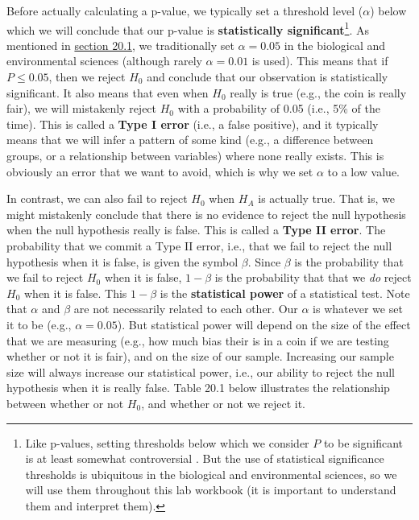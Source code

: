 \documentclass[
]{scrbook}
\begin{document}
Before actually calculating a p-value, we typically set a threshold level (\(\alpha\)) below which we will conclude that our p-value is \textbf{statistically significant}\footnote{Like p-values, setting thresholds below which we consider \(P\) to be significant is at least somewhat controversial \citep{McShane2019, Mayo2021}. But the use of statistical significance thresholds is ubiquitous in the biological and environmental sciences, so we will use them throughout this lab workbook (it is important to understand them and interpret them).}.
As mentioned in \protect\hyperlink{how-ridiculous-is-our-hypothesis}{section 20.1}, we traditionally set \(\alpha= 0.05\) in the biological and environmental sciences (although rarely \(\alpha = 0.01\) is used).
This means that if \(P \leq 0.05\), then we reject \(H_{0}\) and conclude that our observation is statistically significant.
It also means that even when \(H_{0}\) really is true (e.g., the coin is really fair), we will mistakenly reject \(H_{0}\) with a probability of 0.05 (i.e., 5\% of the time).
This is called a \textbf{Type I error} (i.e., a false positive), and it typically means that we will infer a pattern of some kind (e.g., a difference between groups, or a relationship between variables) where none really exists.
This is obviously an error that we want to avoid, which is why we set \(\alpha\) to a low value.

In contrast, we can also fail to reject \(H_{0}\) when \(H_{A}\) is actually true.
That is, we might mistakenly conclude that there is no evidence to reject the null hypothesis when the null hypothesis really is false.
This is called a \textbf{Type II error}.
The probability that we commit a Type II error, i.e., that we fail to reject the null hypothesis when it is false, is given the symbol \(\beta\).
Since \(\beta\) is the probability that we fail to reject \(H_{0}\) when it is false, \(1 - \beta\) is the probability that that we \emph{do} reject \(H_{0}\) when it is false.
This \(1 - \beta\) is the \textbf{statistical power} of a statistical test.
Note that \(\alpha\) and \(\beta\) are not necessarily related to each other.
Our \(\alpha\) is whatever we set it to be (e.g., \(\alpha = 0.05\)).
But statistical power will depend on the size of the effect that we are measuring (e.g., how much bias their is in a coin if we are testing whether or not it is fair), and on the size of our sample.
Increasing our sample size will always increase our statistical power, i.e., our ability to reject the null hypothesis when it is really false.
Table 20.1 below illustrates the relationship between whether or not \(H_{0}\), and whether or not we reject it.
\end{document}
